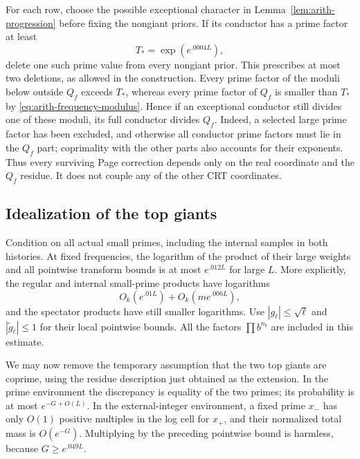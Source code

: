 For each row, choose the possible exceptional character in
Lemma~\ref{lem:arith-progression} before fixing the nongiant priors. If its
conductor has a prime factor at least
\begin{equation}\label{eq:arith-deletion-threshold}
                         T_*=\exp(e^{.0004L}),
\end{equation}
delete one such prime value from every nongiant prior. This prescribes at
most two deletions, as allowed in the construction. Every prime factor of
the moduli below outside $Q_f$ exceeds $T_*$, whereas every prime factor of
$Q_f$ is smaller than $T_*$ by \eqref{eq:arith-frequency-modulus}. Hence if
an exceptional conductor still divides one of these moduli, its full
conductor divides $Q_f$. Indeed, a selected large prime factor has been
excluded, and otherwise all conductor prime factors must lie in the $Q_f$
part; coprimality with the other parts also accounts for their exponents.
Thus every surviving Page correction depends only on the real coordinate
and the $Q_f$ residue. It does not couple any of the other CRT coordinates.

\subsection{Idealization of the top giants}

Condition on all actual small primes, including the internal samples in
both histories. At fixed frequencies, the logarithm of the product of their
large weights and all pointwise transform bounds is at most $e^{.012L}$ for
large $L$. More explicitly, the regular and internal small-prime products
have logarithms
\begin{equation}\label{eq:arith-small-size-budget}
 O_k(e^{.01L})+O_k(m e^{.006L}),
\end{equation}
and the spectator products have still smaller logarithms. Use
$|g_\ell|\leq\sqrt\ell$ and $|\widetilde g_\ell|\leq1$ for their local
pointwise bounds. All the factors $\prod b^{n_b}$ are included in this
estimate.

We may now remove the temporary assumption that the two top giants are
coprime, using the residue description just obtained as the extension.
In the prime environment the discrepancy is equality of the two primes;
its probability is at most $e^{-G+O(L)}$. In the external-integer
environment, a fixed prime $x_-$ has only $O(1)$ positive multiples in the
log cell for $x_+$, and their normalized total mass is $O(e^{-G})$.
Multiplying by the preceding pointwise bound is harmless, because
$G\geq e^{.049L}$.

